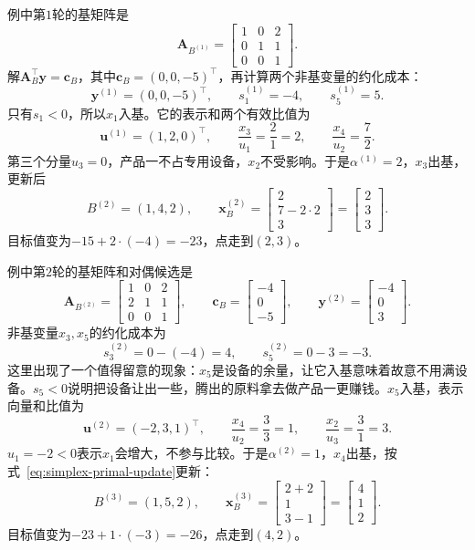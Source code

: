 例中第$1$轮的基矩阵是
\[
 \bm{A}_{B^{(1)}}=\begin{bmatrix}1&0&2\\0&1&1\\0&0&1\end{bmatrix}.
\]
解$\bm{A}_B^\top\bm{y}=\bm{c}_B$，其中$\bm{c}_B=(0,0,-5)^\top$，再计算两个非基变量的约化成本：
\[
 \bm{y}^{(1)}=(0,0,-5)^\top,\qquad s_1^{(1)}=-4,\qquad s_5^{(1)}=5.
\]
只有$s_1<0$，所以$x_1$入基。它的表示和两个有效比值为
\[
 \bm{u}^{(1)}=(1,2,0)^\top,\qquad
 \frac{x_3}{u_1}=\frac{2}{1}=2,\qquad
 \frac{x_4}{u_2}=\frac{7}{2}.
\]
第三个分量$u_3=0$，产品一不占专用设备，$x_2$不受影响。于是$\alpha^{(1)}=2$，$x_3$出基，更新后
\[
 B^{(2)}=(1,4,2),\qquad \bm{x}_B^{(2)}=\begin{bmatrix}2\\7-2\cdot2\\3\end{bmatrix}=\begin{bmatrix}2\\3\\3\end{bmatrix}.
\]
目标值变为$-15+2\cdot(-4)=-23$，点走到$(2,3)$。

例中第$2$轮的基矩阵和对偶候选是
\[
 \bm{A}_{B^{(2)}}=\begin{bmatrix}1&0&2\\2&1&1\\0&0&1\end{bmatrix},\qquad
 \bm{c}_B=\begin{bmatrix}-4\\0\\-5\end{bmatrix},\qquad
 \bm{y}^{(2)}=\begin{bmatrix}-4\\0\\3\end{bmatrix}.
\]
非基变量$x_3,x_5$的约化成本为
\[
 s_3^{(2)}=0-(-4)=4,\qquad s_5^{(2)}=0-3=-3.
\]
这里出现了一个值得留意的现象：$x_5$是设备的余量，让它入基意味着故意不用满设备。$s_5<0$说明把设备让出一些，腾出的原料拿去做产品一更赚钱。$x_5$入基，表示向量和比值为
\[
 \bm{u}^{(2)}=(-2,3,1)^\top,\qquad
 \frac{x_4}{u_2}=\frac{3}{3}=1,\qquad
 \frac{x_2}{u_3}=\frac{3}{1}=3.
\]
$u_1=-2<0$表示$x_1$会增大，不参与比较。于是$\alpha^{(2)}=1$，$x_4$出基，按式~\eqref{eq:simplex-primal-update}更新：
\[
 B^{(3)}=(1,5,2),\qquad
 \bm{x}_B^{(3)}=\begin{bmatrix}2+2\\1\\3-1\end{bmatrix}=\begin{bmatrix}4\\1\\2\end{bmatrix}.
\]
目标值变为$-23+1\cdot(-3)=-26$，点走到$(4,2)$。

